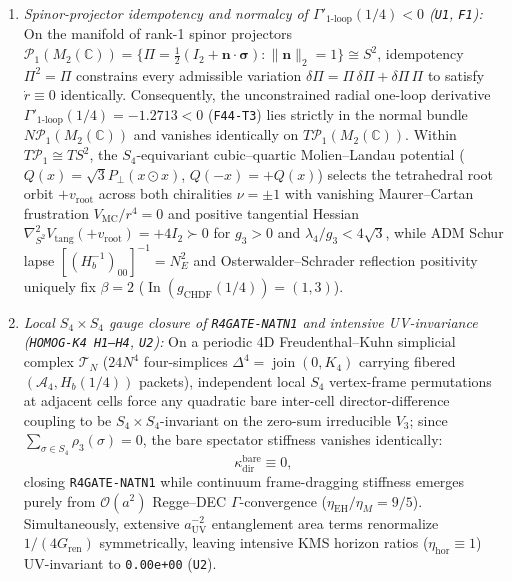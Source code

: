 \documentclass[11pt]{article}
\begin{document}
\begin{enumerate}
\item \emph{Spinor-projector idempotency and normalcy of $\Gamma'_{1\text{-loop}}(1/4)<0$ (\texttt{U1}, \texttt{F1}):} On the manifold of rank-1 spinor projectors $\mathcal{P}_1(M_2(\mathbb{C}))=\{\Pi=\frac{1}{2}(I_2+\mathbf{n}\cdot\boldsymbol{\sigma}):\|\mathbf{n}\|_2=1\}\cong S^2$, idempotency $\Pi^2=\Pi$ constrains every admissible variation $\delta\Pi=\Pi\,\delta\Pi+\delta\Pi\,\Pi$ to satisfy $\dot{r}\equiv 0$ identically. Consequently, the unconstrained radial one-loop derivative $\Gamma'_{1\text{-loop}}(1/4)=-1.2713<0$ (\texttt{F44-T3}) lies strictly in the normal bundle $N\mathcal{P}_1(M_2(\mathbb{C}))$ and vanishes identically on $T\mathcal{P}_1(M_2(\mathbb{C}))$. Within $T\mathcal{P}_1\cong TS^2$, the $S_4$-equivariant cubic--quartic Molien--Landau potential ($Q(x)=\sqrt{3}P_\perp(x\odot x)$, $Q(-x)=+Q(x)$) selects the tetrahedral root orbit $+v_{\mathrm{root}}$ across both chiralities $\nu=\pm 1$ with vanishing Maurer--Cartan frustration $V_{\mathrm{MC}}/r^4=0$ and positive tangential Hessian $\nabla^2_{S^2}V_{\mathrm{tang}}(+v_{\mathrm{root}})=+4I_2\succ 0$ for $g_3>0$ and $\lambda_4/g_3<4\sqrt{3}$, while ADM Schur lapse $[(H_b^{-1})_{00}]^{-1}=N_E^2$ and Osterwalder--Schrader reflection positivity uniquely fix $\beta=2$ ($\operatorname{In}(g_{\mathrm{CHDF}}(1/4))=(1,3)$).
\item \emph{Local $S_4\times S_4$ gauge closure of \texttt{R4GATE-NATN1} and intensive UV-invariance (\texttt{HOMOG-K4 H1--H4}, \texttt{U2}):} On a periodic 4D Freudenthal--Kuhn simplicial complex $\mathcal{T}_N$ ($24N^4$ four-simplices $\Delta^4=\operatorname{join}(0,K_4)$ carrying fibered $(\mathcal{A}_4,H_b(1/4))$ packets), independent local $S_4$ vertex-frame permutations at adjacent cells force any quadratic bare inter-cell director-difference coupling to be $S_4\times S_4$-invariant on the zero-sum irreducible $V_3$; since $\sum_{\sigma\in S_4}\rho_3(\sigma)=0$, the bare spectator stiffness vanishes identically:
\begin{equation}
  \boxed{\kappa_{\mathrm{dir}}^{\mathrm{bare}} \equiv 0,}
  \label{eq:paperiv-r4gate-closed}
\end{equation}
closing \texttt{R4GATE-NATN1} while continuum frame-dragging stiffness emerges purely from $\mathcal{O}(a^2)$ Regge--DEC $\Gamma$-convergence ($\eta_{\mathrm{EH}}/\eta_M=9/5$). Simultaneously, extensive $a_{\mathrm{UV}}^{-2}$ entanglement area terms renormalize $1/(4G_{\mathrm{ren}})$ symmetrically, leaving intensive KMS horizon ratios ($\eta_{\mathrm{hor}}\equiv 1$) UV-invariant to \texttt{0.00e+00} (\texttt{U2}).

\end{enumerate}
\end{document}
